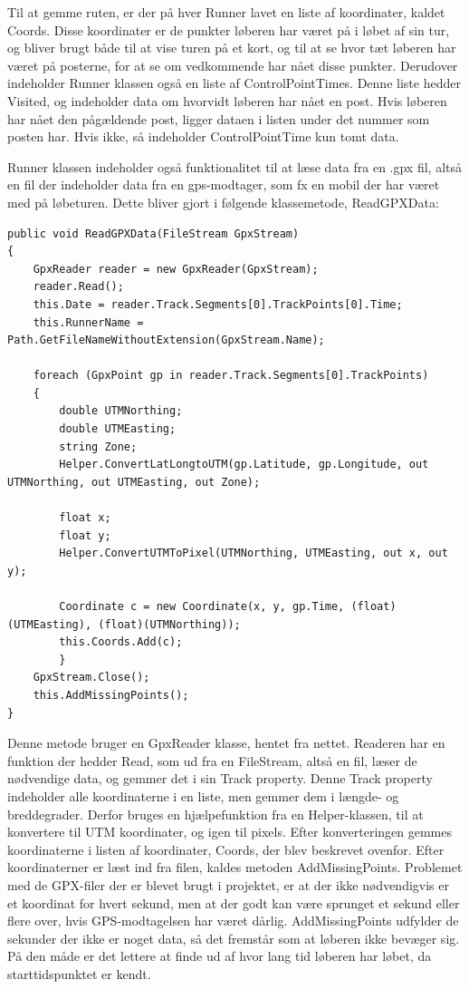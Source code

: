 Til at gemme ruten, er der på hver Runner lavet en liste af koordinater, kaldet Coords.
Disse koordinater er de punkter løberen har været på i løbet af sin tur, og bliver brugt både til at vise turen på et kort, og til at se hvor tæt løberen har været på posterne, for at se om vedkommende har nået disse punkter.
Derudover indeholder Runner klassen også en liste af ControlPointTimes. Denne liste hedder Visited, og indeholder data om hvorvidt løberen har nået en post. Hvis løberen har nået den pågældende post, ligger dataen i listen under det nummer som posten har. Hvis ikke, så indeholder ControlPointTime kun tomt data. 
 

Runner klassen indeholder også funktionalitet til at læse data fra en .gpx fil, altså en fil der indeholder data fra en gps-modtager, som fx en mobil der har været med på løbeturen.
Dette bliver gjort i følgende klassemetode, ReadGPXData:


\begin{lstlisting}
public void ReadGPXData(FileStream GpxStream)
{
	GpxReader reader = new GpxReader(GpxStream);
	reader.Read();
	this.Date = reader.Track.Segments[0].TrackPoints[0].Time;
	this.RunnerName = Path.GetFileNameWithoutExtension(GpxStream.Name);

	foreach (GpxPoint gp in reader.Track.Segments[0].TrackPoints)
	{
		double UTMNorthing;
		double UTMEasting;
		string Zone;
        Helper.ConvertLatLongtoUTM(gp.Latitude, gp.Longitude, out UTMNorthing, out UTMEasting, out Zone);

        float x;
        float y;
        Helper.ConvertUTMToPixel(UTMNorthing, UTMEasting, out x, out y);

        Coordinate c = new Coordinate(x, y, gp.Time, (float)(UTMEasting), (float)(UTMNorthing));
        this.Coords.Add(c);
        }
    GpxStream.Close();
    this.AddMissingPoints();
}
\end{lstlisting}

Denne metode bruger en GpxReader klasse, hentet fra nettet\citep{GPXR}. Readeren har en funktion der hedder Read, som ud fra en FileStream, altså en fil, læser de nødvendige data, og gemmer det i sin Track property. Denne Track property indeholder alle koordinaterne i en liste, men gemmer dem i længde- og breddegrader. Derfor bruges en hjælpefunktion fra en Helper-klassen, til at konvertere til UTM koordinater, og igen til pixels. Efter konverteringen gemmes koordinaterne i listen af koordinater, Coords, der blev beskrevet ovenfor. 
Efter koordinaterner er læst ind fra filen, kaldes metoden AddMissingPoints. Problemet med de GPX-filer der er blevet brugt i projektet, er at der ikke nødvendigvis er et koordinat for hvert sekund, men at der godt kan være sprunget et sekund eller flere over, hvis GPS-modtagelsen har været dårlig. AddMissingPoints udfylder de sekunder der ikke er noget data, så det fremstår som at løberen ikke bevæger sig. På den måde er det lettere at finde ud af hvor lang tid løberen har løbet, da starttidspunktet er kendt.
 
